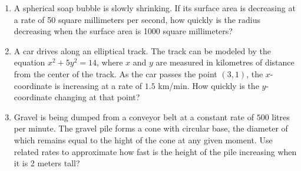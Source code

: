 \begin{enumerate}[ref={\fcProblemRef}]
\item \label{problemRelatedRatesFinddr/dtIfds/dtIsKnownS-sphere} A spherical soap bubble is slowly shrinking. If its surface area is decreasing at a rate of 50 square millimeters per
second, how quickly is the radius decreasing when the surface area is 1000 square millimeters?


\item \label{problemRelatedRatesCarAlongEllipticalTrack}A car drives along an elliptical track. The track can be modeled by the equation $x^2 + 5y^2 = 14$, where $x$ and $y$ are 
measured in kilometres of distance from the center of the track. As the car passes the point $(3, 1)$, the $x$-coordinate is 
increasing at a rate of $1.5$ km/min. How quickly is the $y$-coordinate changing at that point?

\item \label{problemRelatedRatesGravelCone} Gravel is being dumped from a conveyor belt at a constant rate of $ 500 $ litres per minute. The gravel pile forms a cone with circular base, the diameter of which remains equal to the hight of the cone at any given moment. Use related rates to approximate how fast is the height of the pile increasing when it is 2 meters tall?
\end{enumerate}